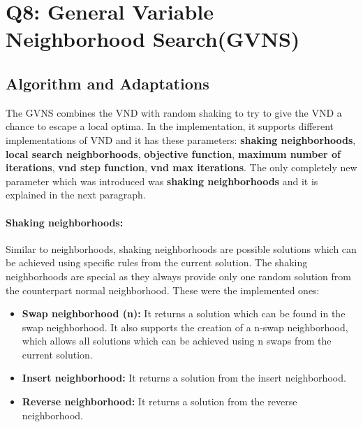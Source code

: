 \documentclass{article}
\begin{document}
\section*{Q8: General Variable Neighborhood Search(GVNS)}
\subsection*{Algorithm and Adaptations}
The GVNS combines the VND with random shaking to try to give the VND a chance to escape a local optima. In the implementation, it supports different implementations of VND and it has these parameters:  \textbf{shaking neighborhoods},  \textbf{local search neighborhoods},  \textbf{objective function},  \textbf{maximum number of iterations},  \textbf{vnd step function},  \textbf{vnd max iterations}. The only completely new parameter which was introduced was \textbf{shaking neighborhoods} and it is explained in the next paragraph.

\paragraph{Shaking neighborhoods:}
Similar to neighborhoods, shaking neighborhoods are possible solutions which can be achieved using specific rules from the current solution. The shaking neighborhoods are special as they always provide only one random solution from the counterpart normal neighborhood. These were the implemented ones:
\begin{itemize}
	\item \textbf{Swap neighborhood (n):} It returns a solution which can be found in the swap neighborhood. It also supports the creation of a n-swap neighborhood, which allows all solutions which can be achieved using n swaps from the current solution.
	\item \textbf{Insert neighborhood:} It returns a solution from the insert neighborhood.
	\item \textbf{Reverse neighborhood:} It returns a solution from the reverse neighborhood.
\end{itemize}
\end{document}
